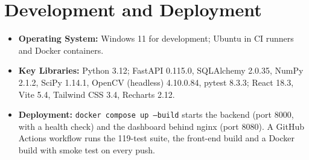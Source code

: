 \section{Development and Deployment}
\begin{itemize}
  \item \textbf{Operating System:} Windows 11 for development; Ubuntu in CI runners and Docker containers.
  \item \textbf{Key Libraries:} Python 3.12; FastAPI 0.115.0, SQLAlchemy 2.0.35, NumPy 2.1.2, SciPy 1.14.1, OpenCV (headless) 4.10.0.84, pytest 8.3.3; React 18.3, Vite 5.4, Tailwind CSS 3.4, Recharts 2.12.
  \item \textbf{Deployment:} \texttt{docker compose up --build} starts the backend (port 8000, with a health check) and the dashboard behind nginx (port 8080). A GitHub Actions workflow runs the 119-test suite, the front-end build and a Docker build with smoke test on every push.
\end{itemize}
